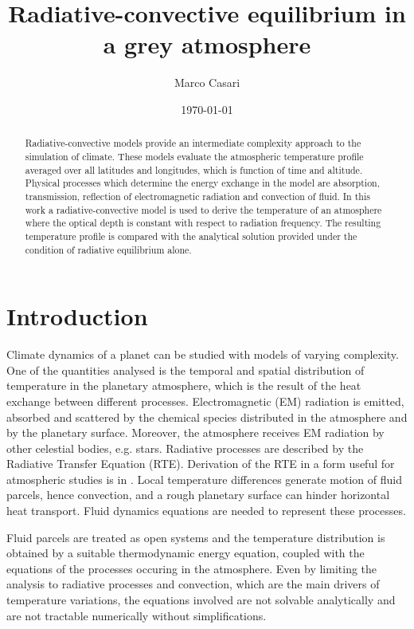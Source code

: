\documentclass[a4paper,10pt,twocolumn,\classoptions]{article}
\begin{document}
\title{Radiative-convective equilibrium in a grey atmosphere}
\author{Marco Casari}
\date{\today}
\maketitle

\begin{abstract}
  Radiative-convective models provide an intermediate complexity approach to the simulation of climate. These models evaluate the atmospheric temperature profile averaged over all latitudes and longitudes, which is function of time and altitude.
  Physical processes which determine the energy exchange in the model are absorption, transmission, reflection of electromagnetic radiation and convection of fluid.
  In this work a radiative-convective model is used to derive the temperature of an atmosphere where the optical depth is constant with respect to radiation frequency. The resulting temperature profile is compared with the analytical solution provided under the condition of radiative equilibrium alone.
\end{abstract}

\section{Introduction}
\label{sec:Introduction}
Climate dynamics of a planet can be studied with models of varying complexity. One of the quantities analysed is the temporal and spatial distribution of temperature in the planetary atmosphere, which is the result of the heat exchange between different processes. Electromagnetic (EM) radiation is emitted, absorbed and scattered by the chemical species distributed in the atmosphere and by the planetary surface. Moreover, the atmosphere receives EM radiation by other celestial bodies, e.g. stars. Radiative processes are described by the Radiative Transfer Equation (RTE). Derivation of the RTE in a form useful for atmospheric studies is in \cite[25]{Modest}.
Local temperature differences generate motion of fluid parcels, hence convection, and a rough planetary surface can hinder horizontal heat transport. Fluid dynamics equations are needed to represent these processes.

Fluid parcels are treated as open systems and the temperature distribution is obtained by a suitable thermodynamic energy equation, coupled with the equations of the processes occuring in the atmosphere. Even by limiting the analysis to radiative processes and convection, which are the main drivers of temperature variations, the equations involved are not solvable analytically and are not tractable numerically without simplifications.
\end{document}
